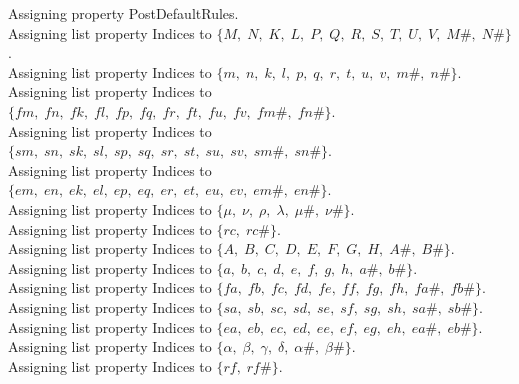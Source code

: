 \documentclass[11pt]{article}
\begin{document}
Assigning property PostDefaultRules.
\\
Assigning list property Indices to $\{M,\; N,\; K,\; L,\; P,\; Q,\; R,\; S,\; T,\; U,\; V,\; M\#,\; N\#\}$.
\\
Assigning list property Indices to $\{m,\; n,\; k,\; l,\; p,\; q,\; r,\; t,\; u,\; v,\; m\#,\; n\#\}$.
\\
Assigning list property Indices to $\{fm,\; fn,\; fk,\; fl,\; fp,\; fq,\; fr,\; ft,\; fu,\; fv,\; fm\#,\; fn\#\}$.
\\
Assigning list property Indices to $\{sm,\; sn,\; sk,\; sl,\; sp,\; sq,\; sr,\; st,\; su,\; sv,\; sm\#,\; sn\#\}$.
\\
Assigning list property Indices to $\{em,\; en,\; ek,\; el,\; ep,\; eq,\; er,\; et,\; eu,\; ev,\; em\#,\; en\#\}$.
\\
Assigning list property Indices to $\{\mu,\; \nu,\; \rho,\; \lambda,\; \mu\#,\; \nu\#\}$.
\\
Assigning list property Indices to $\{rc,\; rc\#\}$.
\\
Assigning list property Indices to $\{A,\; B,\; C,\; D,\; E,\; F,\; G,\; H,\; A\#,\; B\#\}$.
\\
Assigning list property Indices to $\{a,\; b,\; c,\; d,\; e,\; f,\; g,\; h,\; a\#,\; b\#\}$.
\\
Assigning list property Indices to $\{fa,\; fb,\; fc,\; fd,\; fe,\; ff,\; fg,\; fh,\; fa\#,\; fb\#\}$.
\\
Assigning list property Indices to $\{sa,\; sb,\; sc,\; sd,\; se,\; sf,\; sg,\; sh,\; sa\#,\; sb\#\}$.
\\
Assigning list property Indices to $\{ea,\; eb,\; ec,\; ed,\; ee,\; ef,\; eg,\; eh,\; ea\#,\; eb\#\}$.
\\
Assigning list property Indices to $\{\alpha,\; \beta,\; \gamma,\; \delta,\; \alpha\#,\; \beta\#\}$.
\\
Assigning list property Indices to $\{rf,\; rf\#\}$.
\\
\end{document}
